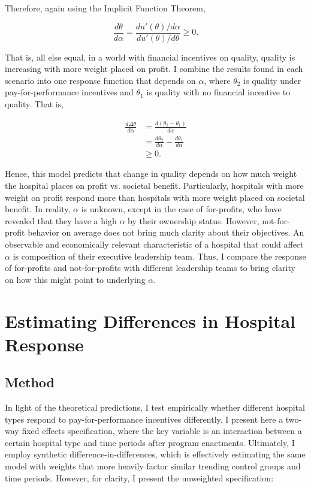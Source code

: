 \documentclass[12pt]{article}
\begin{document}
    Therefore, again using the Implicit Function Theorem,

    $$\frac{d\theta}{d\alpha} = \frac{du'(\theta)/d\alpha}{du'(\theta)/d\theta}\geq0.$$

    That is, all else equal, in a world with financial incentives on quality, quality is increasing with more weight placed on profit. I combine the results found in each scenario into one response function that depends on $\alpha$, where $\theta_2$ is quality under pay-for-performance incentives and $\theta_1$ is quality with no financial incentive to quality. That is, 

    \begin{align*}
        \frac{d\Delta\theta}{d\alpha}&=\frac{d(\theta_2-\theta_1)}{d\alpha}\\
        &=\frac{d\theta_2}{d\alpha}-\frac{d\theta_1}{d\alpha}\\
        &\geq 0.
    \end{align*}


    Hence, this model predicts that change in quality depends on how much weight the hospital places on profit vs. societal benefit. Particularly, hospitals with more weight on profit respond more than hospitals with more weight placed on societal benefit. In reality, $\alpha$ is unknown, except in the case of for-profits, who have revealed that they have a high $\alpha$ by their ownership status. However, not-for-profit behavior on average does not bring much clarity about their objectives. An observable and economically relevant characteristic of a hospital that could affect $\alpha$ is composition of their executive leadership team. Thus, I compare the response of for-profits and not-for-profits with different leadership teams to bring clarity on how this might point to underlying $\alpha$.

    \section{Estimating Differences in Hospital Response}

    \subsection{Method}

    In light of the theoretical predictions, I test empirically whether different hospital types respond to pay-for-performance incentives differently. I present here a two-way fixed effects specification, where the key variable is an interaction between a certain hospital type and time periods after program enactments. Ultimately, I employ synthetic difference-in-differences, which is effectively estimating the same model with weights that more heavily factor similar trending control groups and time periods. However, for clarity, I present the unweighted specification:
\end{document}
